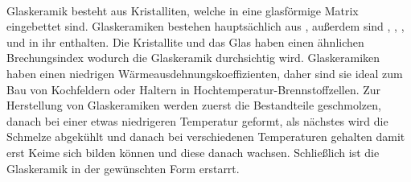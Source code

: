 \documentclass[11pt,a4paper]{article}
\numberwithin{equation}{section}
\numberwithin{figure}{section}
\begin{document}
\\
\begin{addmargin}[25pt]{0pt}
Glaskeramik besteht aus Kristalliten, welche in eine glasförmige Matrix eingebettet sind. Glaskeramiken bestehen hauptsächlich aus , außerdem sind , , ,  und  in ihr enthalten. Die Kristallite und das Glas haben einen ähnlichen Brechungsindex wodurch die Glaskeramik durchsichtig wird. Glaskeramiken haben einen niedrigen Wärmeausdehnungskoeffizienten, daher sind sie ideal zum Bau von Kochfeldern oder Haltern in Hochtemperatur-Brennstoffzellen. Zur Herstellung von Glaskeramiken werden zuerst die Bestandteile geschmolzen, danach bei einer etwas niedrigeren Temperatur geformt, als nächstes wird die Schmelze abgekühlt und danach bei verschiedenen Temperaturen gehalten damit erst Keime sich bilden können und diese danach wachsen. Schließlich ist die Glaskeramik in der gewünschten Form erstarrt. \\
\end{addmargin}
\end{document}
